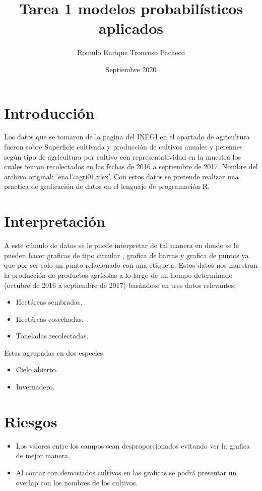 \documentclass{article}
\title{Tarea 1 modelos probabilísticos aplicados}
\author{Romulo Enrique Troncoso Pacheco }
\date{Septiembre  2020}
\begin{document}
\maketitle

\section{Introducción}
Los datos que se tomaron de la pagina del INEGI\citep{INEGI} en el apartado de agricultura fueron sobre Superficie cultivada y producción de cultivos anuales y perennes según tipo de agricultura por cultivo con representatividad en la muestra los cuales feuron recolectados en las fechas de 2016 a septiembre de 2017.
\newline
Nombre del archivo original: 'ena17agri01.xlsx'.
\newline
Con estos datos se pretende realizar una practica de graficación de datos en el lenguaje de programación R.
\section{Interpretación}
A este cúmulo de datos se le puede interpretar de tal manera en donde se le pueden hacer graficas de tipo circular , grafica de barras y grafica de puntos  ya que por ser solo un punto relacionado con una etiqueta. 
\newline
Estos datos nos muestran la producción de productos agrícolas a lo largo de un tiempo determinado (octubre de 2016 a septiembre de 2017) basándose en tres datos relevantes:
\begin{itemize}
    \item Hectáreas sembradas.
    \item Hectáreas cosechadas.
    \item Toneladas recolectadas.
\end{itemize} 
Estas agrupadas  en dos especies
\begin{itemize}
    \item Cielo abierto.
    \item Invernadero.
\end{itemize} 
\section{Riesgos}
\begin{itemize}
    \item Los valores entre los campos sean desproporcionados evitando ver la grafica de mejor manera.
    \item Al contar con demasiados cultivos en las graficas se podrá presentar un overlap con los nombres de los cultivos.
\end{itemize}   
    
\end{document}
